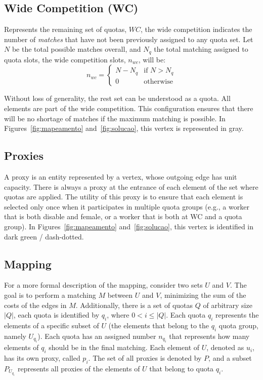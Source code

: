         
            \subsection{Wide Competition (WC)} \label{sec:wc}
            
                Represents the remaining set of quotas, $WC$, the wide competition indicates the number of \textit{matches} that have not been previously assigned to any quota set. Let $N$ be the total possible matches overall, and $N_q$ the total matching assigned to quota slots, the wide competition slots, $n_{wc}$, will be:
                \[
                n_{wc} =
                \begin{cases}
                    N - N_q & \text{if } N > N_q \\
                    0 & \text{otherwise}
                \end{cases}
                \]
                
                Without loss of generality, the rest set can be understood as a quota. All elements are part of the wide competition. This configuration ensures that there will be no shortage of matches if the maximum matching is possible. In Figures~\ref{fig:mapeamento} and~\ref{fig:solucao}, this vertex is represented in gray.
            
            \subsection{Proxies}
            
                A proxy is an entity represented by a vertex, whose outgoing edge has unit capacity. There is always a proxy at the entrance of each element of the set where quotas are applied. The utility of this proxy is to ensure that each element is selected only once when it participates in multiple quota groups (e.g., a worker that is both disable and female, or a worker that is both at WC and a quota group). In Figures~\ref{fig:mapeamento} and~\ref{fig:solucao}, this vertex is identified in dark green / dash-dotted.
            
            \subsection{Mapping}
            
            For a more formal description of the mapping, consider two sets $U$ and $V$. The goal is to perform a matching $M$ between $U$ and $V$, minimizing the sum of the costs of the edges in $M$. Additionally, there is a set of quotas $Q$ of arbitrary size $|Q|$, each quota is identified by $q_i$, where $0 < i \leq |Q|$. Each quota $q_i$ represents the elements of a specific subset of $U$ (the elements that belong to the $q_i$ quota group, namely $U_{q_i}$). Each quota has an assigned number $n_{q_i}$ that represents how many elements of $q_i$ should be in the final matching. Each element of $U$, denoted as $u_i$, has its own proxy, called $p_{i}$. The set of all proxies is denoted by $P$, and a subset $P_{U_{q_i}}$ represents all proxies of the elements of $U$ that belong to quota $q_i$.
            
